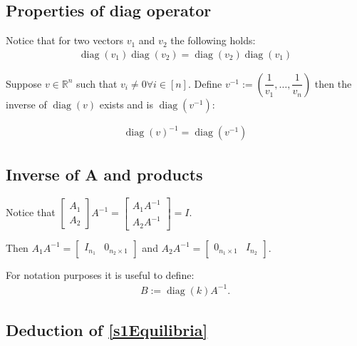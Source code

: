 \documentclass[3p,times]{article}
\newcommand{\R}{\mathbb{R}}
\DeclareMathOperator{\diag}{diag}
\begin{document}
\subsection{Properties of diag operator}

Notice that for two vectors $v_1$ and $v_2$ the following holds:
\begin{align}
\diag(v_1)\diag(v_2) = \diag(v_2)\diag(v_1) 
\end{align}

Suppose $v \in \R^n$ such that $v_i \neq 0 \forall i \in [n]$. Define $v^{-1}:= \left( \dfrac{1}{v_1},\dots,\dfrac{1}{v_n} \right)$ then the inverse of $\diag(v)$ exists and is $\diag(v^{-1})$:

\begin{align}
\diag(v)^{-1} = \diag(v^{-1}) 
\end{align}

\subsection{Inverse of A and products}
Notice that $\begin{bmatrix}
A_1 \\ A_2
\end{bmatrix} A^{-1} = \begin{bmatrix}
A_1A^{-1} \\ A_2A^{-1}
\end{bmatrix}=I $.

Then $A_1A^{-1}= \begin{bmatrix}
I_{n_1}& 0_{n_2 \times 1} 
\end{bmatrix}$ and $A_2A^{-1}= \begin{bmatrix}
0_{n_1 \times 1} & I_{n_2}
\end{bmatrix}$.

For notation purposes it is useful to define: \begin{align}
B := \diag(k) A^{-1}.
\end{align}

\subsection{Deduction of  \eqref{s1Equilibria}}
\end{document}
